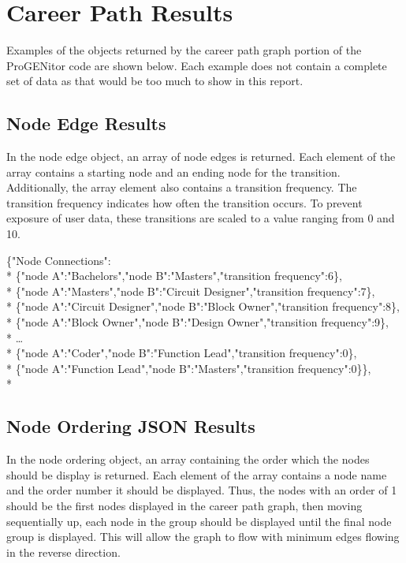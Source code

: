 \section{Career Path Results}
\label{sect:career-path-results}
Examples of the objects returned by the career path graph portion of the
ProGENitor code are shown below.  Each example does not contain a complete set
of data as that would be too much to show in this report.

\subsection{Node Edge Results}
In the node edge object, an array of node edges is returned.  Each element
of the array contains a starting node and an ending node for the transition. 
Additionally, the array element also contains a transition frequency.  The
transition frequency indicates how often the transition occurs.  To
prevent exposure of user data, these transitions are scaled to a value
ranging from 0 and 10.

\begin{tt}
\begin{footnotesize}
\noindent\{"Node Connections":\\*
\{"node A":"Bachelors","node B":"Masters","transition frequency":6\},\\*
\{"node A":"Masters","node 	B":"Circuit Designer","transition frequency":7\},\\*
\{"node A":"Circuit Designer","node B":"Block 	Owner","transition
 frequency":8\},\\* 
\{"node A":"Block Owner","node B":"Design Owner","transition frequency":9\},\\*
\ldots\\* 
\{"node A":"Coder","node B":"Function Lead","transition frequency":0\},\\*
\{"node A":"Function Lead","node B":"Masters","transition frequency":0\}\},\\*
\end{footnotesize}
\end{tt}


\subsection{Node Ordering JSON Results}
In the node ordering object, an array containing the order which the nodes
should be display is returned.  Each element of the array contains a node name
and the order number it should be displayed.  Thus, the nodes with an order of
1 should be the first nodes displayed in the career path graph, then
moving sequentially up, each node in the group should be displayed until the
final node group is displayed.  This will allow the graph to flow with minimum
edges flowing in the reverse direction.

